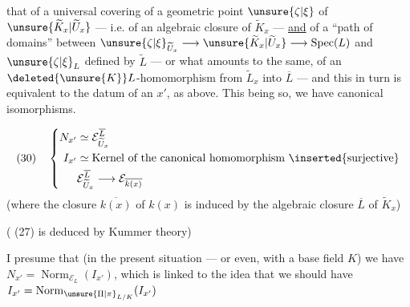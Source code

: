 
that of a universal covering   of a geometric point $\unsure{\zeta|\xi}$ of $\unsure{\widetilde K_x|\widetilde U_x}$ --- i.e. of an algebraic closure of $\widetilde K_x$ --- \uline{and} of a  ``path of domains'' between $\unsure{\zeta|\xi}_{\widetilde U_x}\longrightarrow\unsure{\widetilde K_x|\widetilde U_x}\longrightarrow\operatorname{Spec}(L)$ and $\unsure{\zeta|\xi}_L$ defined by $\widetilde L$ --- or what amounts to the same,  of an $\deleted{\unsure{K}}L$-homomorphism from   $\widetilde L_x$ into $\overline L$ --- and this in turn is equivalent to the datum of an $x'$,  as above. This being so, we have canonical isomorphisms.

\[
(30)\quad\left\{\begin{aligned}
N_{x'}&\simeq\mathcal E_{\widetilde U_x}^{\overline L}\\
I_{x'}&\simeq\text{Kernel of the canonical homomorphism }\inserted{\text{surjective}}\\
&\mathcal E_{\widetilde U_x}^{\overline L}\longrightarrow\mathcal E_{\overline{k(x)}}
\end{aligned}\right.
\]
(where the  closure $\overline{k(x)}$ of $k(x)$ is induced by the algebraic closure $\overline L$ of $\widetilde K_x$)


( (27) is deduced by Kummer theory)\unsure{,}



I presume that (in the present situation --- or even, with a base field $K$) we have $N_{x'}=\operatorname{Norm}_{\mathcal E_L}(I_{x'})$,  which is linked to the idea that we should have $I_{x'}=\operatorname{Norm}_{\unsure{\Pi|\pi}_{L/K}}(I_{x'})$

